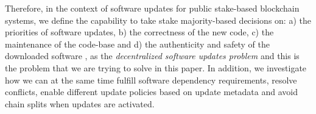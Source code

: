 Therefore, in the context of software updates for public stake-based blockchain systems, we define the capability to take stake majority-based decisions on: a) the priorities of software updates, b) the correctness of the new code, c) the maintenance of the code-base and d) the authenticity and safety of the downloaded software
, as the \emph{decentralized software updates problem} and this is the problem that we are trying to solve in this paper. In addition, we investigate how we can at the same time fulfill software dependency requirements, resolve conflicts, enable different update policies based on update metadata and avoid chain splits when updates are activated.



